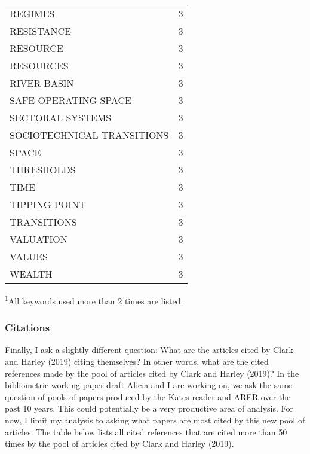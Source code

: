 \documentclass[]{article}
\begin{document}
\begin{longtable}{lc}
REGIMES & 3 \\ 
RESISTANCE & 3 \\ 
RESOURCE & 3 \\ 
RESOURCES & 3 \\ 
RIVER BASIN & 3 \\ 
SAFE OPERATING SPACE & 3 \\ 
SECTORAL SYSTEMS & 3 \\ 
SOCIOTECHNICAL TRANSITIONS & 3 \\ 
SPACE & 3 \\ 
THRESHOLDS & 3 \\ 
TIME & 3 \\ 
TIPPING POINT & 3 \\ 
TRANSITIONS & 3 \\ 
VALUATION & 3 \\ 
VALUES & 3 \\ 
WEALTH & 3 \\ 
\bottomrule
\end{longtable}
\vspace{-5mm}
\begin{minipage}{\linewidth}
\textsuperscript{1}All keywords used more than 2 times are listed. \\ 
\end{minipage}

\hypertarget{citations}{%
\subsubsection{Citations}\label{citations}}

Finally, I ask a slightly different question: What are the articles
cited by Clark and Harley (2019) citing themselves? In other words, what
are the cited references made by the pool of articles cited by Clark and
Harley (2019)? In the bibliometric working paper draft Alicia and I are
working on, we ask the same question of pools of papers produced by the
Kates reader and ARER over the past 10 years. This could potentially be
a very productive area of analysis. For now, I limit my analysis to
asking what papers are most cited by this new pool of articles. The
table below lists all cited references that are cited more than 50 times
by the pool of articles cited by Clark and Harley (2019).
\captionsetup[table]{labelformat=empty,skip=1pt}
\end{document}
